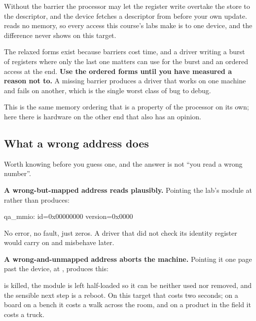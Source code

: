 \noindent Without the barrier the processor may let the register write overtake the store to the
descriptor, and the device fetches a descriptor from before your own update.  reads no
memory, so every access this course's labs make is to one device, and the difference never shows
on this target.

The relaxed forms exist because barriers cost time, and a driver writing a burst of
registers where only the last one matters can use  for the burst and an ordered
access at the end. \textbf{Use the ordered forms until you have measured a reason not to.} A missing
barrier produces a driver that works on one machine and fails on another, which is the single worst
class of bug to debug.

This is the same memory ordering that is a property of the processor on its own; here there is
hardware on the other end that also has an opinion.

\subsection{What a wrong address does}
\label{c6:app:b6}

Worth knowing before you guess one, and the answer is not ``you read a wrong number''.

\textbf{A wrong-but-mapped address reads plausibly.} Pointing the lab's module at  rather
than  produces:

\begin{console}
qa_mmio: id=0x00000000 version=0x0000
\end{console}

\noindent No error, no fault, just zeros. A driver that did not check its identity register would
carry on and misbehave later.

\textbf{A wrong-and-unmapped address aborts the machine.} Pointing it one page past the device, at
, produces this:


\noindent {} is killed, the module is left half-loaded so it can be neither used nor
removed, and the sensible next step is a reboot. On this target that costs two seconds; on a board
on a bench it costs a walk across the room, and on a product in the field it costs a truck.

